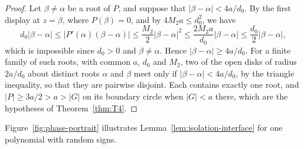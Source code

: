 \begin{proof}
Let $\beta\ne\alpha$ be a root of $P$, and suppose that
$|\beta-\alpha|<4a/d_0$. By the first display at $z=\beta$, where
$P(\beta)=0$, and by $4M_2a\le d_0^2$, we have
\[
 d_0|\beta-\alpha|\le|P'(\alpha)(\beta-\alpha)|
 \le\frac{M_2}2|\beta-\alpha|^2
 \le\frac{2M_2a}{d_0}|\beta-\alpha|
 \le\frac{d_0}2|\beta-\alpha|,
\]
which is impossible since $d_0>0$ and $\beta\ne\alpha$. Hence
$|\beta-\alpha|\ge4a/d_0$.
For a finite family of such roots, with common $a$, $d_0$ and $M_2$,
two of the open disks of radius
$2a/d_0$ about distinct roots $\alpha$ and $\beta$ meet only if
$|\beta-\alpha|<4a/d_0$, by the triangle inequality, so that they are
pairwise disjoint. Each contains exactly one root, and $|P|\ge3a/2>a>|G|$
on its boundary circle when $|G|<a$ there, which are the hypotheses of
Theorem~\ref{thm:T4}.
\end{proof}

Figure~\ref{fig:phase-portrait} illustrates
Lemma~\ref{lem:isolation-interface} for one polynomial with random signs.


